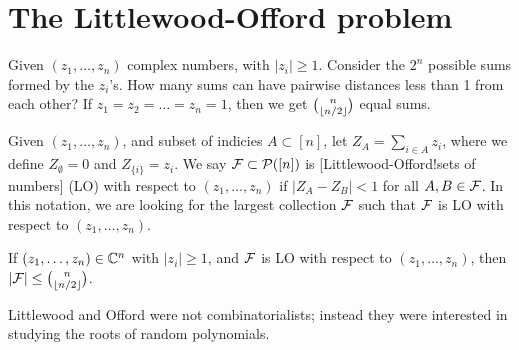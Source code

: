 
\section{The Littlewood-Offord problem}

\begin{problem}[\cite{LO1943}]
Given $(z_1,\dotsc,z_n)$ complex numbers, with $|z_i| \geq 1$. Consider the $2^n$ possible sums formed by the $z_i$'s. How many sums can have pairwise distances less than 1 from each other? If $z_1 = z_2 = \dotsc =z_n=1$, then we get ${n \choose \lfloor n/2\rfloor}$ equal sums.

Given $(z_1,\dotsc,z_n)$, and subset of indicies $A\subset [n]$, let $Z_A = \sum_{i\in A} z_i$, where we define  $Z_\emptyset = 0$ and $Z_{\{i\}} = z_i$. We say $\mathcal{F} \subset \mathcal{P}([n])$ is [Littlewood-Offord!sets of numbers] (LO) with respect to $(z_1,\dotsc,z_n)$ if $|Z_A- Z_B| < 1$ for all $A,B \in \mathcal{F}$. In this notation, we are looking for the largest collection $\mathcal{F}$ such that $\mathcal{F}$ is LO with respect to $(z_1,\dotsc,z_n)$.
\end{problem}

\begin{conjecture*}
If $(z_1,\dotsc,z_n) \in \mathbb{C}^n$ with $|z_i|\geq 1$, and $\mathcal{F}$ is LO with respect to $(z_1,\dotsc,z_n)$, then $|\mathcal{F}| \leq {n \choose \lfloor n/2\rfloor}$.
\end{conjecture*}
\begin{remark}
Littlewood and Offord were not combinatorialists; instead they were interested in studying the roots of random polynomials.
\end{remark}

